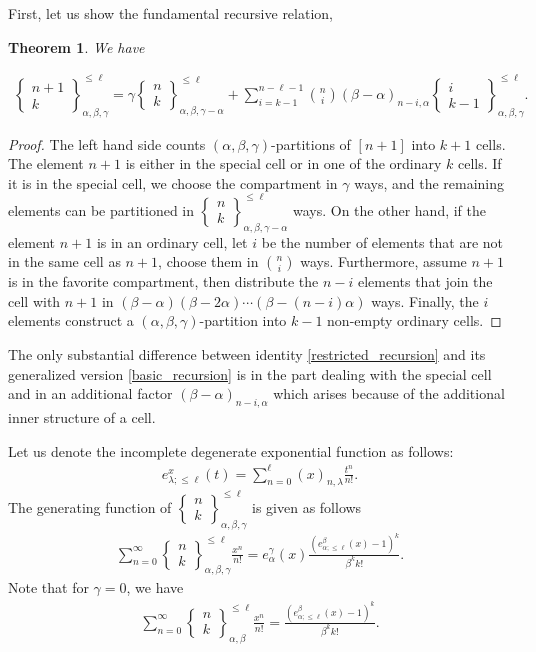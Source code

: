\documentclass[12pt, reqno]{amsart}
\newtheorem{proof 1}{proof 1}
\newtheorem{theorem}{Theorem}[section]
\def\sts#1#2{\begin{Bmatrix}
#1 \\ #2 \end{Bmatrix}}
\begin{document}
First, let us show the fundamental recursive relation,
\begin{theorem}\label{theorem:2_1} We have

\begin{align}\label{basic_recursion}
\sts{n+1}{k}_{\alpha, \beta, \gamma}^{\leq \ell} = \gamma \sts{n}{k}_{\alpha, \beta, \gamma-\alpha}^{\leq \ell} + \sum_{i=k-1}^{n-\ell-1}\binom{n}{i}(\beta-\alpha)_{n-i,\alpha}\sts{i}{k-1}_{\alpha, \beta,\gamma}^{\leq \ell}.
\end{align}
\end{theorem}
\begin{proof}
The left hand side counts $(\alpha,\beta,\gamma)$-partitions of $[n+1]$ into $k+1$ cells. 
The element $n+1$ is either in the special cell or in one of the ordinary $k$ cells. If it is in the special cell, we choose the compartment in $\gamma$ ways, and the remaining elements can be partitioned in $\sts{n}{k}_{\alpha, \beta, \gamma-\alpha}^{\leq \ell}$ ways. On the other hand, if the element $n+1$ is in an ordinary cell, let $i$ be the number of elements that are not in the same cell as $n+1$, choose them in $\binom{n}{i}$ ways. Furthermore, assume $n+1$ is in the favorite compartment, then distribute the $n-i$ elements that join the cell with $n+1$ in $(\beta-\alpha)(\beta-2\alpha)\cdots(\beta-(n-i)\alpha)$ ways. Finally, the $i$ elements construct a $(\alpha, \beta, \gamma)$-partition into $k-1$ non-empty ordinary cells.
\end{proof}

The only substantial difference between identity \eqref{restricted_recursion}  and its generalized version \eqref{basic_recursion} is in the part dealing with the special cell and in an additional factor $(\beta-\alpha)_{n-i,\alpha}$ which arises because of the additional inner structure of a cell.



Let us denote the incomplete degenerate exponential function as follows:
\begin{align*}
e_{\lambda;\leq \ell}^x (t) = \sum_{n=0}^{\ell} (x)_{n,\lambda}\frac{t^n}{n!}.
\end{align*}
The generating function of $\sts{n}{k}_{\alpha, \beta, \gamma}^{\leq \ell}$ is given as follows
\begin{align*}
\sum_{n=0}^{\infty} \sts{n}{k}_{\alpha, \beta, \gamma}^{\leq \ell} \frac{x^n}{n!} = e^{\gamma}_{\alpha}(x) \frac{\left(e^{\beta}_{\alpha;\leq \ell}(x)-1\right)^k}{\beta^kk!}.
\end{align*}
Note that for $\gamma =0$, we have 
\begin{align*}
\sum_{n=0}^{\infty} \sts{n}{k}_{\alpha, \beta}^{\leq \ell} \frac{x^n}{n!} = \frac{\left(e^{\beta}_{\alpha;\leq \ell}(x)-1\right)^k}{\beta^kk!}.
\end{align*}
\end{document}
